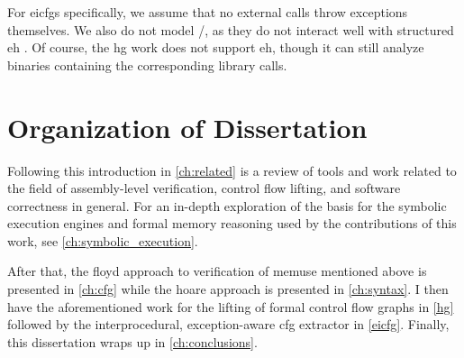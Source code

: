 For \glspl{eicfg} specifically, we assume that no external calls throw exceptions themselves.
We also do not model /, as they do not interact well with structured \gls{eh} \autocite{using-setjmp-and-longjmp}.
Of course, the \gls{hg} work does not support \gls{eh}, though it can still analyze binaries containing the corresponding library calls.


\section{Organization of Dissertation}
Following this introduction in \cref{ch:related} is a review of tools and work related to the field of assembly-level verification, control flow lifting, and software correctness in general.
For an in-depth exploration of the basis for the symbolic execution engines and formal memory reasoning used by the contributions of this work,
see \cref{ch:symbolic_execution}.

After that, the \gls{floyd} approach to verification of \gls{memuse} mentioned above is presented in \cref{ch:cfg} while the \gls{hoare} approach is presented in \cref{ch:syntax}.
I then have the aforementioned work for the lifting of formal control flow graphs in \cref{hg}
followed by the interprocedural, exception-aware \gls{cfg} extractor in \cref{eicfg}.
Finally, this dissertation wraps up in \cref{ch:conclusions}.
